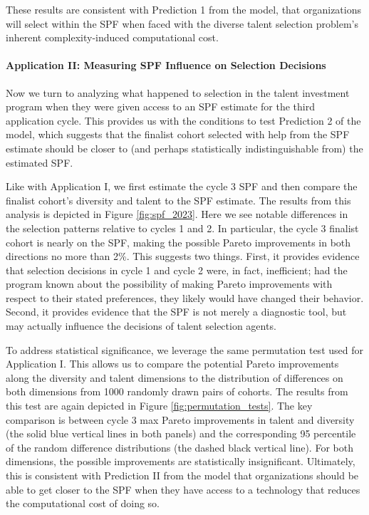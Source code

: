 These results are consistent with Prediction 1 from the model, that organizations will select within the SPF when faced with the diverse talent selection problem's inherent complexity-induced computational cost. 

\paragraph*{Application II: Measuring SPF Influence on Selection Decisions}

Now we turn to analyzing what happened to selection in the talent investment program when they were given access to an SPF estimate for the third application cycle. This provides us with the conditions to test Prediction 2 of the model, which suggests that the finalist cohort selected with help from the SPF estimate should be closer to (and perhaps statistically indistinguishable from) the estimated SPF.

Like with Application I, we first estimate the cycle 3 SPF and then compare the finalist cohort's diversity and talent to the SPF estimate. The results from this analysis is depicted in Figure \ref{fig:spf_2023}. Here we see notable differences in the selection patterns relative to cycles 1 and 2. In particular, the cycle 3 finalist cohort is nearly on the SPF, making the possible Pareto improvements in both directions no more than 2\%. This suggests two things. First, it provides evidence that selection decisions in cycle 1 and cycle 2 were, in fact, inefficient; had the program known about the possibility of making Pareto improvements with respect to their stated preferences, they likely would have changed their behavior. Second, it provides evidence that the SPF is not merely a diagnostic tool, but may actually influence the decisions of talent selection agents. 

To address statistical significance, we leverage the same permutation test used for Application I. This allows us to compare the potential Pareto improvements along the diversity and talent dimensions to the distribution of differences on both dimensions from 1000 randomly drawn pairs of cohorts. The results from this test are again depicted in Figure \ref{fig:permutation_tests}. The key comparison is between cycle 3 max Pareto improvements in talent and diversity (the solid blue vertical lines in both panels) and the corresponding 95 percentile of the random difference distributions (the dashed black vertical line). For both dimensions, the possible improvements are statistically insignificant. Ultimately, this is consistent with Prediction II from the model that organizations should be able to get closer to the SPF when they have access to a technology that reduces the computational cost of doing so. 


